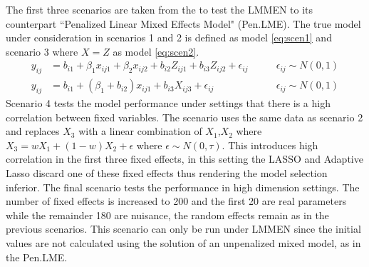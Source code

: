 \documentclass{article}
\begin{document}
The first three scenarios are taken from the \cite{BKG2010} to test the LMMEN to its counterpart ``Penalized Linear Mixed Effects Model"  (Pen.LME). The true model under consideration in scenarios 1 and 2 is defined as model \eqref{eq:scen1} and scenario 3 where $X=Z$ as model \eqref{eq:scen2}.
\begin{subequations}
\begin{align}
y_{ij}&=b_{i1}+\beta_1x_{ij1}+\beta_2x_{ij2}+b_{i2}Z_{ij1}+b_{i3}Z_{ij2}+\epsilon_{ij} &\qquad \epsilon_{ij}\sim N(0,1)
\label{eq:scen1}
\\
y_{ij}&=b_{i1}+(\beta_1+b_{i2})x_{ij1}+b_{i3}X_{ij3}+\epsilon_{ij} &\qquad  \epsilon_{ij}\sim N(0,1)
\label{eq:scen2}
\end{align}
\end{subequations}
Scenario 4 tests the model performance under settings that there is a high correlation between fixed variables. The scenario uses the same data as scenario 2 and replaces $X_3$ with a linear combination of {$X_1$,$X_2$} where $X_3=wX_1+(1-w)X_2+\epsilon$ where $\epsilon\sim N(0,\tau)$. This introduces high correlation in the first three fixed effects, in this setting the LASSO and Adaptive Lasso discard one of these fixed effects thus rendering the model selection inferior. The final scenario tests the performance in high dimension settings. The number of fixed effects is increased to 200 and the first 20 are real parameters while the remainder 180 are nuisance, the random effects remain as in the previous scenarios. This scenario can only be run under LMMEN since the initial values are not calculated using the solution of an unpenalized mixed model, as in the Pen.LME.
\end{document}
